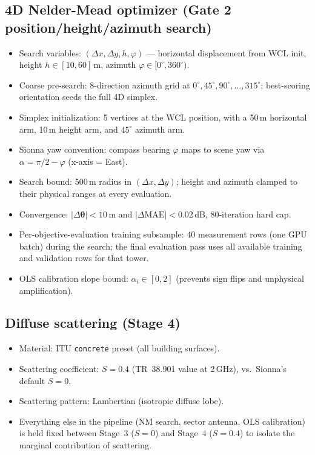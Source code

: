 \documentclass[11pt]{article}
\begin{document}
\subsection{4D Nelder-Mead optimizer (Gate 2 position/height/azimuth search)}
\begin{itemize}
  \item Search variables: $(\Delta x, \Delta y, h, \varphi)$ — horizontal
        displacement from WCL init, height $h \in [10,60]$\,m, azimuth
        $\varphi \in [0^\circ,360^\circ)$.
  \item Coarse pre-search: 8-direction azimuth grid at
        $0^\circ, 45^\circ, 90^\circ, \ldots, 315^\circ$; best-scoring orientation seeds the
        full 4D simplex.
  \item Simplex initialization: 5 vertices at the WCL position, with a
        50\,m horizontal arm, 10\,m height arm, and $45^\circ$ azimuth arm.
  \item Sionna yaw convention: compass bearing $\varphi$ maps to scene yaw
        via $\alpha = \pi/2 - \varphi$ (x-axis = East).
  \item Search bound: 500\,m radius in $(\Delta x, \Delta y)$; height and
        azimuth clamped to their physical ranges at every evaluation.
  \item Convergence: $|\Delta\boldsymbol\theta| < 10$\,m and
        $|\Delta\text{MAE}| < 0.02$\,dB, 80-iteration hard cap.
  \item Per-objective-evaluation training subsample: 40 measurement rows
        (one GPU batch) during the search; the final evaluation pass uses
        all available training and validation rows for that tower.
  \item OLS calibration slope bound: $\alpha_i \in [0, 2]$ (prevents sign
        flips and unphysical amplification).
\end{itemize}

\subsection{Diffuse scattering (Stage 4)}
\begin{itemize}
  \item Material: ITU \texttt{concrete} preset (all building surfaces).
  \item Scattering coefficient: $S = 0.4$ (TR~38.901 value at 2\,GHz),
        vs.\ Sionna's default $S=0$.
  \item Scattering pattern: Lambertian (isotropic diffuse lobe).
  \item Everything else in the pipeline (NM search, sector antenna, OLS
        calibration) is held fixed between Stage~3 ($S=0$) and Stage~4
        ($S=0.4$) to isolate the marginal contribution of scattering.
\end{itemize}
\end{document}
